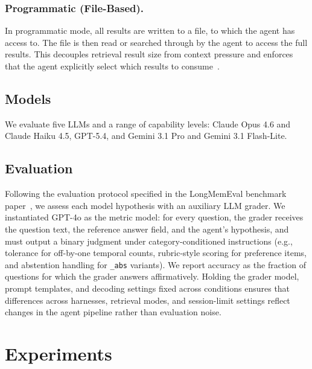 \documentclass[sigconf,nonacm]{acmart}
\begin{document}
\subsubsection{Programmatic (File-Based).}
  In programmatic mode, all results are written to a file, to which the agent has access to. The file is then read or searched through by the agent to access the full results. This decouples retrieval result size from context
  pressure and enforces that the agent explicitly select which results to consume~\cite{packer2023memgpt}.
  
  

\subsection{Models}
\label{sec:models}

We evaluate five LLMs and a range of capability levels: Claude Opus 4.6 and Claude Haiku 4.5, GPT-5.4, and Gemini 3.1 Pro and Gemini 3.1 Flash-Lite. 


\subsection{Evaluation}
  \label{sec:eval}
  Following the evaluation protocol specified in the LongMemEval benchmark paper~\cite{longmemeval}, we assess each model hypothesis with an auxiliary LLM grader. We instantiated GPT-4o as the metric model: for every question, the grader receives the question text, the reference answer field, and the agent's hypothesis, and must
  output a binary judgment under category-conditioned instructions (e.g., tolerance for off-by-one temporal counts, rubric-style scoring for preference items, and abstention handling for \texttt{\_abs}
  variants). We report accuracy as the fraction of questions for which the grader answers affirmatively. Holding the grader model, prompt templates, and decoding settings fixed across conditions ensures
  that differences across harnesses, retrieval modes, and session-limit settings reflect changes in the agent pipeline rather than evaluation noise.



\section{Experiments}
\label{sec:experiments}
\end{document}
